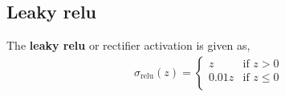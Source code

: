 \begin{appendices}
\subsection{Leaky relu}
The \textbf{leaky relu} or rectifier activation is given as,
\begin{align}
    \sigma_\mathrm{relu}(z) = 
    \begin{cases}
        z & \text{if } z > 0 \\
        0.01z & \text{if } z \leq 0 \\
    \end{cases}
    \label{eq:act-relu}
\end{align}


\end{appendices}